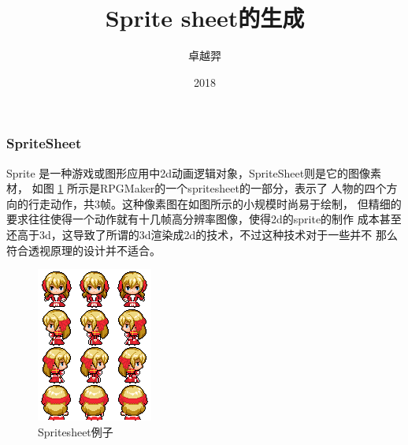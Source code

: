 \documentclass{beamer}
\title{Sprite sheet的生成 }
\author{卓越羿}
\institute[NUST]{}
\date{2018}
\begin{document}
\frame{\titlepage}

\begin{frame}

\frametitle{SpriteSheet}

Sprite 是一种游戏或图形应用中2d动画逻辑对象，SpriteSheet则是它的图像素材，
如图 \ref{fig:highpriest} 所示是RPGMaker的一个spritesheet的一部分，表示了
人物的四个方向的行走动作，共3帧。这种像素图在如图所示的小规模时尚易于绘制，
但精细的要求往往使得一个动作就有十几帧高分辨率图像，使得2d的sprite的制作
成本甚至还高于3d，这导致了所谓的3d渲染成2d的技术，不过这种技术对于一些并不
那么符合透视原理的设计并不适合。

\begin{figure}[htb]
    \centering
    \includegraphics[width=0.3\linewidth]{H.png}
    \caption{Spritesheet例子}
    \label{fig:highpriest}
\end{figure}

\end{frame}
\end{document}
